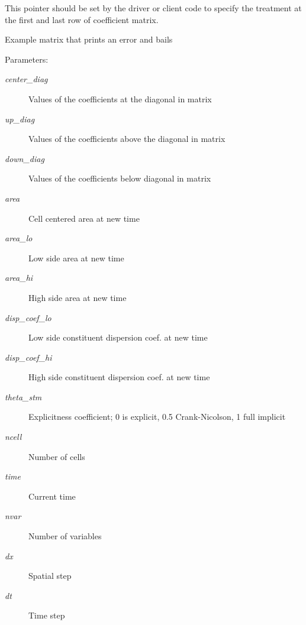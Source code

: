 This pointer should be set by the driver or client code to specify the treatment at the first and last row of coefficient matrix. 

Example matrix that prints an error and bails \begin{Desc}
\item[Parameters:]
\begin{description}
\item[{\em center\_\-diag}]Values of the coefficients at the diagonal in matrix\item[{\em up\_\-diag}]Values of the coefficients above the diagonal in matrix\item[{\em down\_\-diag}]Values of the coefficients below diagonal in matrix\item[{\em area}]Cell centered area at new time \item[{\em area\_\-lo}]Low side area at new time\item[{\em area\_\-hi}]High side area at new time \item[{\em disp\_\-coef\_\-lo}]Low side constituent dispersion coef. at new time\item[{\em disp\_\-coef\_\-hi}]High side constituent dispersion coef. at new time\item[{\em theta\_\-stm}]Explicitness coefficient; 0 is explicit, 0.5 Crank-Nicolson, 1 full implicit \item[{\em ncell}]Number of cells\item[{\em time}]Current time\item[{\em nvar}]Number of variables\item[{\em dx}]Spatial step \item[{\em dt}]Time step \end{description}
\end{Desc}
